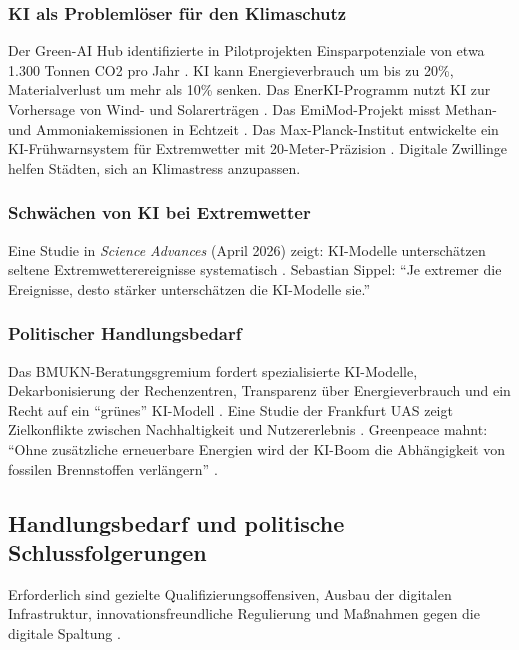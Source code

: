 \documentclass[12pt,a4paper]{article}
\begin{document}
	\subsubsection{KI als Problemlöser für den Klimaschutz}
	
	Der Green-AI Hub identifizierte in Pilotprojekten Einsparpotenziale von etwa 1.300 Tonnen CO2 pro Jahr \cite{GreenAI2025}. KI kann Energieverbrauch um bis zu 20\%, Materialverlust um mehr als 10\% senken. Das EnerKI-Programm nutzt KI zur Vorhersage von Wind- und Solarerträgen \cite{BMWK2025}. Das EmiMod-Projekt misst Methan- und Ammoniakemissionen in Echtzeit \cite{BMEL2025}. Das Max-Planck-Institut entwickelte ein KI-Frühwarnsystem für Extremwetter mit 20-Meter-Präzision \cite{MPI2025}. Digitale Zwillinge helfen Städten, sich an Klimastress anzupassen.
	
	\subsubsection{Schwächen von KI bei Extremwetter}
	
	Eine Studie in \textit{Science Advances} (April 2026) zeigt: KI-Modelle unterschätzen seltene Extremwetterereignisse systematisch \cite{KIT2026}. Sebastian Sippel: \enquote{Je extremer die Ereignisse, desto stärker unterschätzen die KI-Modelle sie.}
	
	\subsubsection{Politischer Handlungsbedarf}
	
	Das BMUKN-Beratungsgremium fordert spezialisierte KI-Modelle, Dekarbonisierung der Rechenzentren, Transparenz über Energieverbrauch und ein Recht auf ein \enquote{grünes} KI-Modell \cite{BMUKN2026}. Eine Studie der Frankfurt UAS zeigt Zielkonflikte zwischen Nachhaltigkeit und Nutzererlebnis \cite{FrankfurtUAS2026}. Greenpeace mahnt: \enquote{Ohne zusätzliche erneuerbare Energien wird der KI-Boom die Abhängigkeit von fossilen Brennstoffen verlängern} \cite{Greenpeace2025}.
	
	\subsection{Handlungsbedarf und politische Schlussfolgerungen}
	
	Erforderlich sind gezielte Qualifizierungsoffensiven, Ausbau der digitalen Infrastruktur, innovationsfreundliche Regulierung und Maßnahmen gegen die digitale Spaltung \cite{IAB2025a, OECD2025, Bitkom2025}.
	
\end{document}
